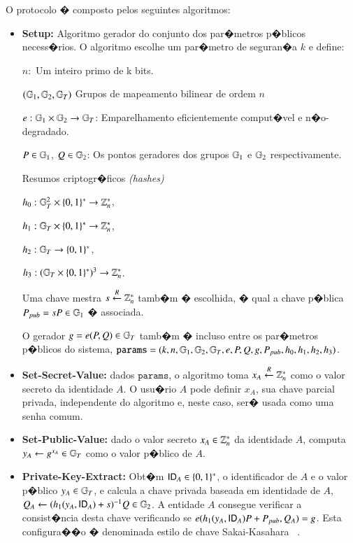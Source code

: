\documentclass[a4paper,capchap,espacoduplo,normaltoc]{abntepusp}
\begin{document}
O protocolo � composto pelos seguintes algoritmos:
\begin{itemize}

\item \textbf{Setup:} Algoritmo gerador do conjunto dos par�metros p�blicos necess�rios. 
O algoritmo escolhe um par�metro de seguran�a $k$ e define:

$n:$  Um inteiro primo de k bits. 

$(\mathbb{G}_1,\mathbb{G}_2,\mathbb{G}_T)$ Grupos de mapeamento bilinear de ordem $n$  

$e: \mathbb{G}_1 \times \mathbb{G}_2 \rightarrow \mathbb{G}_T$: Emparelhamento eficientemente comput�vel e n�o-degradado.

$P \in \mathbb{G}_1$, $Q \in \mathbb{G}_2$: Os pontos geradores dos grupos $\mathbb{G}_1$ e $\mathbb{G}_2$ respectivamente.

Resumos criptogr�ficos \emph{(hashes)} 

$h_0: \mathbb{G}_T^2 \times \{0, 1\}^\ast \rightarrow \mathbb{Z}_n^\ast$,

$h_1: \mathbb{G}_T \times \{0, 1\}^\ast \rightarrow \mathbb{Z}_n^\ast$, %

$h_2: \mathbb{G}_T \rightarrow \{0, 1\}^\ast$, %

$h_3: (\mathbb{G}_T \times \{0, 1\}^\ast)^3 \rightarrow \mathbb{Z}_n^\ast$. %

Uma chave mestra $s \stackrel{R}{\gets} \mathbb{Z}_n^\ast$ tamb�m � escolhida, � qual a chave p�blica 
$P_{pub} = sP \in \mathbb{G}_1$ � associada. 

O gerador $g = e(P, Q) \in \mathbb{G}_T$ tamb�m � incluso entre os par�metros p�blicos do sistema, $\texttt{params} = (k, n, \mathbb{G}_1, \mathbb{G}_2, \mathbb{G}_T, e, P, Q, g, P_{pub}, h_0, h_1, h_2, h_3)$.


\item \textbf{Set-Secret-Value:} dados $\texttt{params}$, o algoritmo toma $x_A \stackrel{R}{\gets} \mathbb{Z}_n^\ast$ como o valor secreto da identidade $A$. O usu�rio $A$ pode definir $x_A$, sua chave parcial privada, independente do algoritmo e, neste caso, ser� usada como uma senha comum.

\item \textbf{Set-Public-Value:} dado o valor secreto $x_A \in \mathbb{Z}_n^\ast$ da identidade $A$, computa $y_A \gets g^{x_A} \in \mathbb{G}_T$ como o valor p�blico de $A$.

\item \textbf{Private-Key-Extract:} Obt�m $\mathsf{ID}_A \in \{0, 1\}^\ast$, o identificador de $A$  e  o valor p�blico $y_A \in \mathbb{G}_T$, e calcula a chave privada baseada em identidade de $A$, $Q_A \gets (h_1(y_A, \mathsf{ID}_A) + s)^{-1}Q \in \mathbb{G}_2$. A entidade $A$ consegue verificar a consist�ncia desta chave verificando se $e(h_1(y_A, \mathsf{ID}_A)P + P_{pub}, Q_A) = g$. Esta configura��o � denominada estilo de chave Sakai-Kasahara ~\cite{sakai-kasahara}.


\end{itemize}
\end{document}
